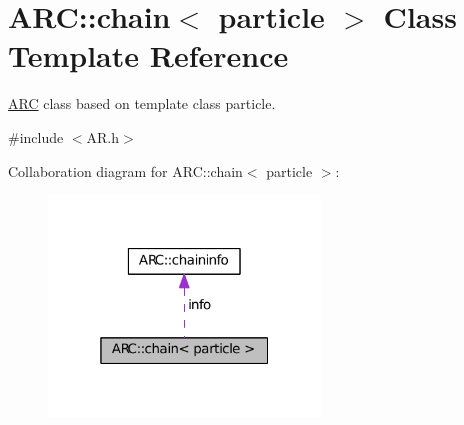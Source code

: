 \hypertarget{classARC_1_1chain}{}\section{A\+RC\+:\+:chain$<$ particle $>$ Class Template Reference}
\label{classARC_1_1chain}


\hyperlink{namespaceARC}{A\+RC} class based on template class particle.  




{\ttfamily \#include $<$A\+R.\+h$>$}



Collaboration diagram for A\+RC\+:\+:chain$<$ particle $>$\+:\nopagebreak
\begin{figure}[H]
\begin{center}
\leavevmode
\includegraphics[width=205pt]{classARC_1_1chain__coll__graph}
\end{center}
\end{figure}
